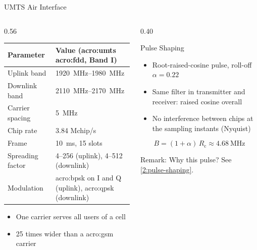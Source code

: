 \begin{frame}{UMTS Air Interface}
  \begin{columns}[T,onlytextwidth]
    \begin{column}{0.56\textwidth}
      \centering
      \footnotesize
      \begin{tabular}{ll}
        \toprule
        \textbf{Parameter} & \textbf{Value (\acrshort{acro:umts} \acrshort{acro:fdd}, Band I)}~\cite{ts25101,ts25201} \\
        \midrule
        Uplink band & \qtyrange{1920}{1980}{\mega\hertz} \\
        Downlink band & \qtyrange{2110}{2170}{\mega\hertz} \\
        Carrier spacing & \qty{5}{\mega\hertz} \\
        Chip rate & \num{3.84} Mchip/s \\
        Frame & \qty{10}{\milli\second}, 15 slots \\
        Spreading factor & 4--256 (uplink), 4--512 (downlink) \\
        Modulation & \acrshort{acro:bpsk} on I and Q (uplink), \acrshort{acro:qpsk} (downlink) \\
        \bottomrule
      \end{tabular}

      \normalsize
      \raggedright
      \vspace{0.5em}
      \begin{itemize}
        \item One carrier serves all users of a cell
        \item 25 times wider than a \gls{acro:gsm} carrier
      \end{itemize}
    \end{column}
    \begin{column}{0.40\textwidth}
      \begin{block}{Pulse Shaping}
        \begin{itemize}
          \item Root-raised-cosine pulse, roll-off $\alpha = 0.22$
          \item Same filter in transmitter and receiver: raised cosine overall
          \item No interference between chips at the sampling instants (Nyquist)
        \end{itemize}
        \[ B = (1 + \alpha)\, R_\mathrm{c} \approx \qty{4.68}{\mega\hertz} \]
      \end{block}
      \alert{Remark:} Why this pulse? See \cref{2:pulse-shaping}.
    \end{column}
  \end{columns}
\end{frame}

